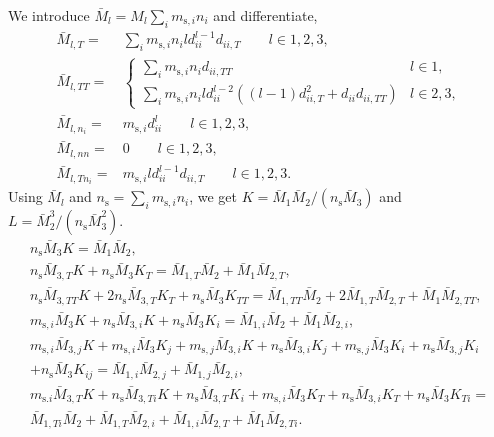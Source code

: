 \documentclass[english]{../thermomemo/thermomemo}
\newcommand*{\lb}{\left(}
\newcommand*{\rb}{\right)}
\newcommand{\seg}{\ensuremath{\text{s}}\xspace}
\begin{document}
We introduce $\bar{M}_{l} = M_{l}\sum_i m_{\seg,i} n_{i}$ and differentiate,
\begin{align}
  \label{eq:M_l_diff}
  \bar{M}_{l,T} =&  \sum_i m_{\seg,i} n_{i} l d_{ii}^{l-1}d_{ii,T} \qquad l \in { 1,2,3 }, \\
  \bar{M}_{l,TT} =&  \begin{cases}
    \sum_i m_{\seg,i} n_{i} d_{ii,TT} & l \in { 1}, \\
    \sum_i m_{\seg,i} n_{i} l d_{ii}^{l-2} \lb \lb l-1\rb d_{ii,T}^2 + d_{ii}d_{ii,TT}\rb & l \in { 2,3 },
  \end{cases}\\
  \bar{M}_{l,n_i} =&  m_{\seg,i} d_{ii}^l \qquad l \in { 1,2,3 }, \\
  \bar{M}_{l,nn} =&  0 \qquad l \in { 1,2,3 }, \\
  \bar{M}_{l,Tn_i} =& m_{\seg,i} l d_{ii}^{l-1}d_{ii,T} \qquad l \in { 1,2,3 }.
\end{align}
Using $\bar{M}_{l}$ and $n_{\seg} = \sum_i m_{\seg,i} n_{i}$, we get
$K=\bar{M}_1\bar{M}_2/\lb n_\seg \bar{M}_3\rb$ and
$L=\bar{M}_2^3/\lb n_\seg \bar{M}_3^2\rb$.
\begin{gather}
  \label{eq:K_diff}
  n_\seg \bar{M}_{3} K = \bar{M}_{1}\bar{M}_{2} ,\\
  n_\seg \bar{M}_{3,T} K + n_\seg \bar{M}_{3} K_T = \bar{M}_{1,T}\bar{M}_{2} + \bar{M}_{1}\bar{M}_{2,T},\\
  n_\seg \bar{M}_{3,TT} K + 2 n_\seg \bar{M}_{3,T} K_T + n_\seg \bar{M}_{3} K_{TT} = \bar{M}_{1,TT}\bar{M}_{2} + 2 \bar{M}_{1,T}\bar{M}_{2,T} + \bar{M}_{1}\bar{M}_{2,TT},\\
  m_{\seg,i} \bar{M}_{3} K + n_\seg \bar{M}_{3,i} K + n_\seg \bar{M}_{3} K_{i} = \bar{M}_{1,i}\bar{M}_{2} + \bar{M}_{1}\bar{M}_{2,i} ,\\
  m_{\seg,i} \bar{M}_{3,j} K + m_{\seg,i} \bar{M}_{3} K_{j} + m_{\seg,j} \bar{M}_{3,i} K + n_\seg \bar{M}_{3,i} K_{j} + m_{\seg,j} \bar{M}_{3} K_{i} + n_\seg \bar{M}_{3,j} K_{i} \nonumber \\ + n_\seg \bar{M}_{3} K_{ij} =  \bar{M}_{1,i}\bar{M}_{2,j} + \bar{M}_{1,j}\bar{M}_{2,i} ,\\
  m_{\seg.i} \bar{M}_{3,T} K + n_{\seg} \bar{M}_{3,Ti} K + n_{\seg} \bar{M}_{3,T} K_i + m_{\seg,i} \bar{M}_{3} K_{T} + n_{\seg} \bar{M}_{3,i} K_{T} + n_{\seg} \bar{M}_{3} K_{Ti} = \nonumber \\ \bar{M}_{1,Ti}\bar{M}_{2} + \bar{M}_{1,T}\bar{M}_{2,i} + \bar{M}_{1,i}\bar{M}_{2,T} + \bar{M}_{1}\bar{M}_{2,Ti}.
\end{gather}
\end{document}
